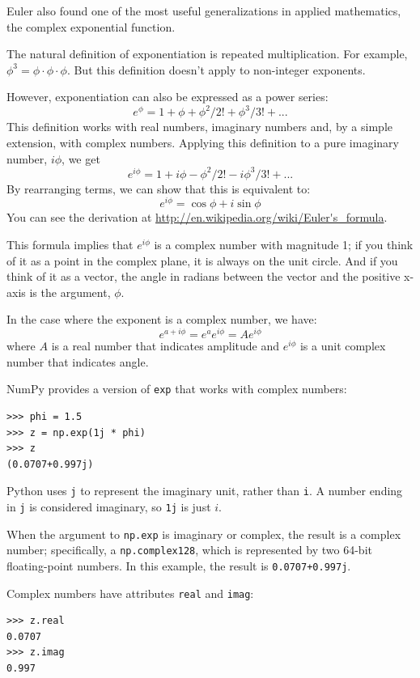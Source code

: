 \documentclass[12pt]{book}
\begin{document}
Euler also found one of the most useful generalizations in applied
mathematics, the complex exponential function.

The natural definition of exponentiation is repeated multiplication.
For example, $\phi^3 = \phi \cdot \phi \cdot \phi$.  But this
definition doesn't apply to non-integer exponents.

However, exponentiation can also be expressed as a power series:
%
\[ e^\phi = 1 + \phi + \phi^2/2! + \phi^3/3! + ... \]
%
This definition works with real numbers, imaginary numbers and, by a simple
extension, with complex numbers.  Applying this definition
to a pure imaginary number, $i\phi$, we get
%
\[ e^{i\phi} = 1 + i\phi - \phi^2/2! - i\phi^3/3! + ... \]
%
By rearranging terms, we can show that this is equivalent to:
%
\[ e^{i\phi} = \cos \phi + i \sin \phi \]
%
You can see the derivation at
\url{http://en.wikipedia.org/wiki/Euler's_formula}.

This formula
implies that $e^{i\phi}$ is a complex number with magnitude 1; if you
think of it as a point in the complex plane, it is always on the unit
circle.  And if you think of it as a vector, the angle in radians
between the vector and the positive x-axis is the argument, $\phi$.

In the case where the exponent is a complex number, we have:
%
\[ e^{a + i\phi} = e^a e^{i\phi} = A e^{i\phi} \]
%
where $A$ is a real number that indicates amplitude and
$e^{i\phi}$ is a unit complex number that indicates angle.

NumPy provides a version of {\tt exp} that works with complex numbers:

\begin{verbatim}
>>> phi = 1.5
>>> z = np.exp(1j * phi)
>>> z
(0.0707+0.997j)
\end{verbatim}

Python uses {\tt j} to represent the imaginary unit, rather
than {\tt i}.  A number ending in {\tt j} is considered imaginary,
so {\tt 1j} is just $i$.

When the argument to {\tt np.exp} is imaginary or complex, the
result is a complex number; specifically, a {\tt np.complex128},
which is represented by two 64-bit floating-point numbers.
In this example, the result is {\tt 0.0707+0.997j}.  

Complex numbers have attributes {\tt real} and {\tt imag}:

\begin{verbatim}
>>> z.real
0.0707
>>> z.imag
0.997
\end{verbatim}
\end{document}
